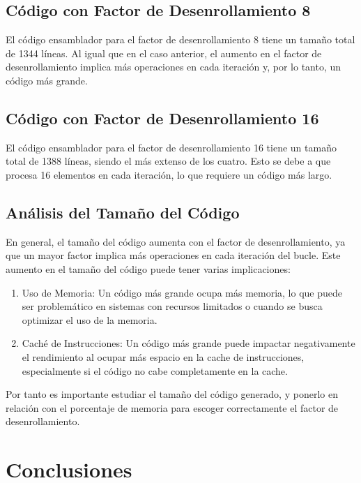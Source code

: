 \documentclass[a4paper,twocolumn]{article}
\begin{document}
\subsection{Código con Factor de Desenrollamiento 8}

El código ensamblador para el factor de desenrollamiento 8 tiene un tamaño total de 1344 líneas. Al igual que en el caso anterior, el aumento en el factor de desenrollamiento implica más operaciones en cada iteración y, por lo tanto, un código más grande.

\subsection{Código con Factor de Desenrollamiento 16}

El código ensamblador para el factor de desenrollamiento 16 tiene un tamaño total de 1388 líneas, siendo el más extenso de los cuatro. Esto se debe a que procesa 16 elementos en cada iteración, lo que requiere un código más largo.

\subsection{Análisis del Tamaño del Código}

En general, el tamaño del código aumenta con el factor de desenrollamiento, ya que un mayor factor implica más operaciones en cada iteración del bucle. Este aumento en el tamaño del código puede tener varias implicaciones:

\begin{enumerate}
	\item Uso de Memoria: Un código más grande ocupa más memoria, lo que puede ser problemático en sistemas con recursos limitados o cuando se busca optimizar el uso de la memoria.

	\item Caché de Instrucciones: Un código más grande puede impactar negativamente el rendimiento al ocupar más espacio en la cache de instrucciones, especialmente si el código no cabe completamente en la cache.
\end{enumerate}

Por tanto es importante estudiar el tamaño del código generado, y ponerlo en relación con el porcentaje de memoria para escoger correctamente el factor de desenrollamiento.

\section{Conclusiones}
\end{document}
